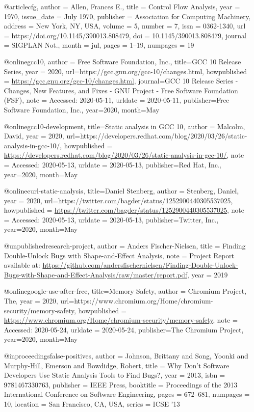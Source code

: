 @article{cfg, author = {Allen, Frances E.},
title = {Control Flow Analysis},
year = {1970},
issue_date = {July 1970},
publisher = {Association for Computing Machinery},
address = {New York, NY, USA},
volume = {5},
number = {7},
issn = {0362-1340},
url = {https://doi.org/10.1145/390013.808479},
doi = {10.1145/390013.808479},
journal = {SIGPLAN Not.},
month = jul,
pages = {1–19},
numpages = {19} 
}

@online{gcc10, author = {Free Software Foundation, Inc.},
title={GCC 10 Release Series}, 
year = 2020,
url={https://gcc.gnu.org/gcc-10/changes.html}, 
howpublished = {\url{https://gcc.gnu.org/gcc-10/changes.html}},
journal={GCC 10 Release Series - Changes, New Features, and Fixes - GNU Project - Free Software Foundation (FSF)}, 
note = {Accessed: 2020-05-11},
urldate = {2020-05-11},
publisher={Free Software Foundation, Inc.}, 
year={2020}, 
month={May}
}

@online{gcc10-development, 
title={Static analysis in GCC 10}, 
author = {Malcolm, David},
year = 2020,
url={https://developers.redhat.com/blog/2020/03/26/static-analysis-in-gcc-10/}, 
howpublished = {\url{https://developers.redhat.com/blog/2020/03/26/static-analysis-in-gcc-10/}},
note = {Accessed: 2020-05-13},
urldate = {2020-05-13},
publisher={Red Hat, Inc.}, 
year={2020}, month={May}
}

@online{curl-static-analysis, 
title={Daniel Stenberg}, 
author = {Stenberg, Daniel},
year = 2020,
url={https://twitter.com/bagder/status/1252900440305537025}, 
howpublished = {\url{https://twitter.com/bagder/status/1252900440305537025}},
note = {Accessed: 2020-05-13},
urldate = {2020-05-13},
publisher={Twitter, Inc.}, 
year={2020}, month={May}
}

@unpublished{research-project,
  author = {Anders Fischer-Nielsen},
  title  = {Finding Double-Unlock Bugs with Shape-and-Effect Analysis},
  note   = {Project Report available at: \url{https://github.com/andersfischernielsen/Finding-Double-Unlock-Bugs-with-Shape-and-Effect-Analysis/raw/master/report.pdf}},
  year   = {2019}
}

@online{google-use-after-free, 
title={Memory Safety}, 
author = {Chromium Project, The},
year = 2020,
url={https://www.chromium.org/Home/chromium-security/memory-safety}, 
howpublished = {\url{https://www.chromium.org/Home/chromium-security/memory-safety}},
note = {Accessed: 2020-05-24},
urldate = {2020-05-24},
publisher={The Chromium Project}, 
year={2020}, month={May}
}

@inproceedings{false-positives, author = {Johnson, Brittany and Song, Yoonki and Murphy-Hill, Emerson and Bowdidge, Robert}, 
title = {Why Don’t Software Developers Use Static Analysis Tools to Find Bugs?},
year = {2013},
isbn = {9781467330763},
publisher = {IEEE Press},
booktitle = {Proceedings of the 2013 International Conference on Software Engineering},
pages = {672–681},
numpages = {10},
location = {San Francisco, CA, USA}, 
series = {ICSE ’13} 
}